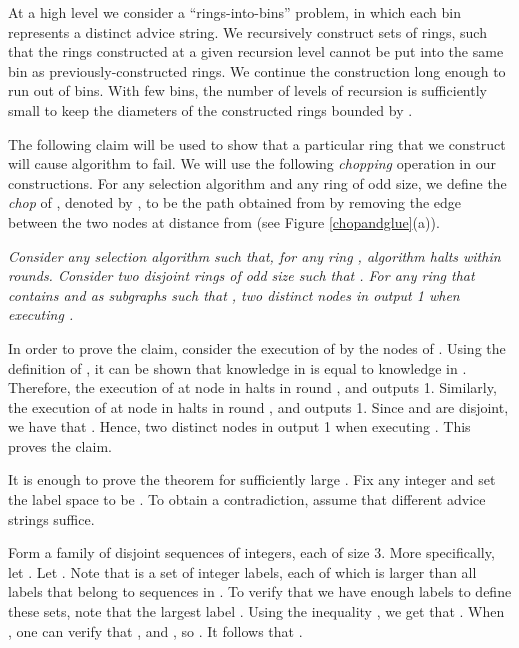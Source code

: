 \documentclass[11pt]{article}
\newcommand{\qed}{\hfill  \bigbreak}
\newenvironment{proof}{\noindent {\bf Proof.}}{\qed}
\begin{document}
\begin{proof}
At a high level we consider a ``rings-into-bins'' problem, in which each bin represents a distinct advice string. We recursively construct sets of rings, such that 
the rings constructed at a given recursion level cannot be put into the same bin as previously-constructed rings. We continue the construction long enough to run out of bins. With few bins, the number of levels of recursion is sufficiently small to keep the diameters of the constructed rings bounded by .

The following claim will be used to show that a particular ring that we construct will cause algorithm  to fail.
We will use the following {\em chopping} operation in our constructions.
For any selection algorithm  and any ring  of odd size, we define the \emph{chop} of , denoted by , to be the path obtained from  by removing the edge between the two nodes at distance  from  (see Figure \ref{chopandglue}(a)).



\vspace{3mm} 
\textit{Consider any selection algorithm  such that, for any ring , algorithm  halts within  rounds. Consider two disjoint rings  of odd size such that . For any ring  that contains  and  as subgraphs such that , two distinct nodes in  output 1 when executing .}
\vspace{3mm}

In order to prove the claim, 
consider the execution of  by the nodes of . Using the definition of , it can be shown that knowledge  in  is equal to knowledge  in . Therefore, the execution of  at node  in  halts in round , and  outputs 1. Similarly, the execution of  at node  in  halts in round , and  outputs 1. Since  and  are disjoint, we have that . Hence, two distinct nodes in  output 1 when executing .
This proves the claim.



It is enough to prove the theorem for sufficiently large .
Fix any integer  and set the label space to be . To obtain a contradiction, assume that  different advice strings suffice. 

Form a family  of  disjoint sequences of integers, each of size 3. More specifically, let . Let . Note that  is a set of integer labels, each of which is larger than all labels that belong to sequences in . To verify that we have enough labels to define these sets, note that the largest label . Using the inequality , we get that . When , one can verify that , and , so . It follows that . 




\end{proof}
\end{document}
